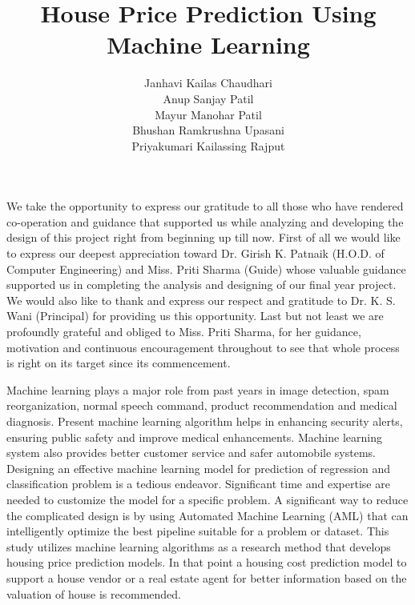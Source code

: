 \documentclass{SSBT-BE}
\begin{document}
\title{House Price Prediction Using Machine Learning}
\author{Janhavi Kailas Chaudhari \\ Anup Sanjay Patil \\ Mayur Manohar Patil \\ Bhushan Ramkrushna Upasani \\ Priyakumari Kailassing Rajput }


\beforepreface


%
We take the opportunity to express our gratitude to all those who have rendered co-operation
and guidance that supported us while analyzing and developing the design of this project
right from beginning up till now.
First of all we would like to express our deepest appreciation toward Dr. Girish K. Patnaik
(H.O.D. of Computer Engineering) and Miss. Priti Sharma (Guide) whose valuable guidance
supported us in completing the analysis and designing of our final year project. We would also like to
thank and express our respect and gratitude to Dr. K. S. Wani (Principal) for providing
us this opportunity.
Last but not least we are profoundly grateful and obliged to Miss. Priti Sharma, for her guidance, motivation and continuous encouragement throughout to see that
whole process is right on its target since its commencement.


\acknowledgeauthor



\newpage


\newpage
\afterpreface
\listoftables
\listoffigures
%
\clearpage
{}
\pagestyle{plain}


Machine learning plays a major role from past years in image detection, spam reorganization, normal speech command, product recommendation and medical diagnosis.
Present machine learning algorithm helps in enhancing security alerts, ensuring public safety and improve medical enhancements. Machine learning system also provides
better customer service and safer automobile systems.\\
Designing an effective machine learning model for prediction of regression and classification problem is a tedious endeavor. Significant time and expertise are needed to
customize the model for a specific problem. A significant way to reduce the complicated design is by using Automated Machine Learning (AML) that can intelligently
optimize the best pipeline suitable for a problem or dataset. This study utilizes machine learning algorithms as a research method that develops housing price prediction
models. In that point a housing cost prediction model to support a house vendor or a
real estate agent for better information based on the valuation of house is recommended.
\end{document}
